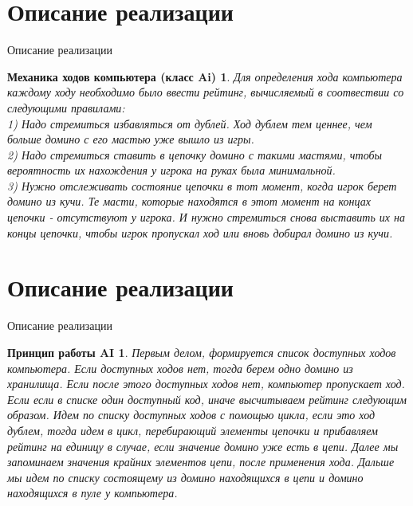 \documentclass[handout]{beamer}
\newtheorem*{comp1}{Механика ходов компьютера (класс Ai)}
\newtheorem*{comp2}{Принцип работы AI}
\begin{document}
  \section{Описание реализации}
 	\begin{frame}{Описание реализации}
 		\begin{comp1}
 			Для определения хода компьютера каждому ходу необходимо было ввести рейтинг, вычисляемый в соотвествии со следующими правилами:\\
 			1) Надо стремиться избавляться от дублей. Ход дублем тем ценнее, чем больше домино с его мастью уже вышло из игры.\\
 			2) Надо стремиться ставить в цепочку домино с такими мастями, чтобы вероятность их нахождения у игрока на руках была минимальной.\\
 			3) Нужно отслеживать состояние цепочки в тот момент, когда игрок берет домино из кучи. Те масти, которые находятся в этот момент на концах цепочки - отсутствуют у игрока. И нужно стремиться снова выставить их на концы цепочки, чтобы игрок пропускал ход или вновь добирал домино из кучи. 
 		\end{comp1}
 \end{frame}

  \section{Описание реализации}
\begin{frame}{Описание реализации}
	\begin{comp2}
	Первым делом, формируется список доступных ходов компьютера. Если доступных ходов нет, тогда берем одно домино из хранилища. Если после этого доступных ходов нет, компьютер пропускает ход. Если если в списке один доступный код, иначе высчитываем рейтинг следующим образом. Идем по списку доступных ходов с помощью цикла, если это ход дублем, тогда идем в цикл, перебирающий элементы цепочки и прибавляем рейтинг на единицу в случае, если значение домино уже есть в цепи. Далее мы запоминаем значения крайних элементов цепи, после применения хода. Дальше мы идем по списку состоящему из домино находящихся в цепи и домино находящихся в пуле у компьютера.
	\end{comp2}
\end{frame}
\end{document}
